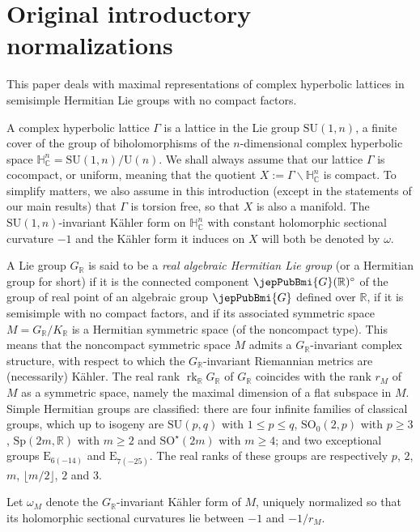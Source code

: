 \section*{Original introductory normalizations}
This paper deals with maximal representations of complex hyperbolic lattices in semisimple Hermitian Lie groups with no compact factors.

A complex hyperbolic lattice $\Gamma$ is a lattice in the Lie group $\mathrm{SU}(1,n)$, a finite cover of the group of biholomorphisms of the $n$-dimensional complex hyperbolic space $\mathbb H^n_{\mathbb C}=\mathrm{SU}(1,n)/\mathrm U(n)$. We shall always assume that our lattice $\Gamma$ is cocompact, or uniform, meaning that the quotient $X:=\Gamma\backslash\mathbb H^n_{\mathbb C}$ is compact. To simplify matters, we also assume in this introduction (except in the statements of our main results) that $\Gamma$ is torsion free, so that $X$ is also a manifold. The $\mathrm{SU}(1,n)$-invariant Kähler form on $\mathbb H^n_{\mathbb C}$ with constant holomorphic sectional curvature $-1$ and the Kähler form it induces on $X$ will both be denoted by $\omega$.

A Lie group $G_{\mathbb R}$ is said to be a \emph{real algebraic Hermitian Lie group} (or a Hermitian group for short) if it is the connected component $\jepPubBmi{G}(\mathbb R)^{\circ}$ of the group of real point of an algebraic group $\jepPubBmi{G}$ defined over $\mathbb R$, if it is semisimple with no compact factors, and if its associated symmetric space $M=G_{\mathbb R}/K_{\mathbb R}$ is a Hermitian symmetric space (of the noncompact type). This means that the noncompact symmetric space $M$ admits a $G_{\mathbb R}$-invariant complex structure, with respect to which the $G_{\mathbb R}$-invariant Riemannian metrics are (necessarily) Kähler. The real rank $\operatorname{rk}_{\mathbb R}G_{\mathbb R}$ of $G_{\mathbb R}$ coincides with the rank $r_M$ of $M$ as a symmetric space, namely the maximal dimension of a flat subspace in $M$. Simple Hermitian groups are classified: there are four infinite families of classical groups, which up to isogeny are $\mathrm{SU}(p,q)$ with $1\leqslant p\leqslant q$, $\mathrm{SO}_0(2,p)$ with $p\geqslant3$, $\mathrm{Sp}(2m,\mathbb R)$ with $m\geqslant2$ and $\mathrm{SO}^{\star}(2m)$ with $m\geqslant4$; and two exceptional groups $\mathrm E_{6(-14)}$ and $\mathrm E_{7(-25)}$. The real ranks of these groups are respectively $p$, $2$, $m$, $\lfloor m/2\rfloor$, $2$ and $3$.

Let $\omega_M$ denote the $G_{\mathbb R}$-invariant Kähler form of $M$, uniquely normalized so that its holomorphic sectional curvatures lie between $-1$ and $-1/r_M$.

